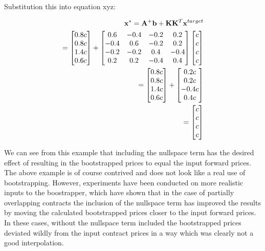 \documentclass{article}
\begin{document}
Substitution this into equation xyz:

\begin{eqnarray}
    \nonumber
    \mathbf{x}^* = \mathbf{A}^+ \mathbf{b} + \mathbf{K} \mathbf{K}^T \mathbf{x}^{target} \\
    \nonumber
    = \begin{bmatrix}
        0.8c \\
        0.8c \\
        1.4c \\
        0.6c \\
    \end{bmatrix} +
    \begin{bmatrix}
        0.6 & -0.4 & -0.2 & 0.2  \\
        -0.4 & 0.6 & -0.2 & 0.2 \\
        -0.2 & -0.2 & 0.4 & -0.4 \\
        0.2 & 0.2 & -0.4 & 0.4
    \end{bmatrix}
    \begin{bmatrix}
        c \\
        c \\
        c \\
        c \\
    \end{bmatrix} \\
    \nonumber
    = \begin{bmatrix}
        0.8c \\
        0.8c \\
        1.4c \\
        0.6c \\
    \end{bmatrix} +
    \begin{bmatrix}
        0.2c \\
        0.2c \\
        -0.4c \\
        0.4c \\
    \end{bmatrix} \\
    = \begin{bmatrix}
        c \\
        c \\
        c \\
        c \\
    \end{bmatrix}
\end{eqnarray}

We can see from this example that including the nullspace term has the desired effect
of resulting in the bootstrapped prices to equal the input forward prices. The above
example is of course contrived and does not look like a real use of bootstrapping.
However, experiments have been conducted on more realistic inputs to the boostrapper,
which have shown that in the case of partially overlapping contracts the inclusion of
the nullspace term has improved the results by moving the calculated bootstrapped prices 
closer to the input forward prices. In these cases, without the nullspace term included
the bootstrapped prices deviated wildly from the input contract prices in a way which was
clearly not a good interpolation.
\end{document}
